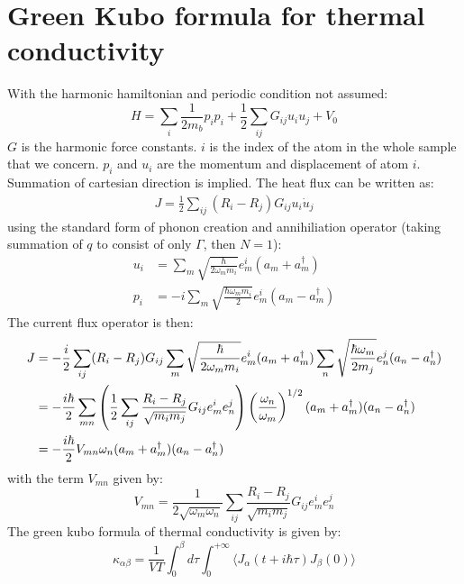 \documentclass{article}
\begin{document}
\section{Green Kubo formula for thermal conductivity}
With the harmonic hamiltonian and periodic condition not assumed:
\begin{equation}
    H = \sum_{i} \frac{1}{2m_b} p_{i} p_{i} + \frac{1}{2} \sum_{ij} G_{ij} u_{i} u_{j} + V_0
\end{equation}
$G$ is the harmonic force constants. $i$ is the index of the atom in the whole sample that we concern. $p_i$ and $u_i$ are the 
momentum and displacement of atom $i$. Summation of cartesian direction is implied. 
The heat flux can be written as:
\begin{eqnarray}
    J = \frac{1}{2}\sum_{ij} (R_i - R_j) G_{ij} u_i \dot{u}_j
\end{eqnarray}
using the standard form of phonon creation and annihiliation operator (taking summation of $q$ to consist of 
only $\Gamma$, then $N = 1$):
\begin{align}
    u_i &= \sum_{m} \sqrt{ \frac{\hbar}{2\omega_m m_i} } e_{m}^i (a_m + a^{\dagger}_m) \\
    p_i &= -i \sum_{m} \sqrt{ \frac{\hbar \omega_m m_i}{2} } e_{m}^i (a_m - a^{\dagger}_m)
\end{align}
The current flux operator is then:
\begin{align}
    J & = -\frac{i}{2} \sum_{ij} (R_i - R_j) G_{ij} \sum_{m} \sqrt{ \frac{\hbar}{2\omega_m m_i} } e_{m}^i (a_m + a^{\dagger}_m)
    \sum_{n} \sqrt{ \frac{\hbar \omega_m}{2m_j} } e_{n}^j (a_n - a^{\dagger}_n) \notag \\
      & = -\frac{i\hbar}{2} \sum_{mn} \left( \frac{1}{2}\sum_{ij} \frac{R_i - R_j}{\sqrt{m_im_j}} G_{ij} e_m^i e_n^j \right) 
      \left(\frac{\omega_n}{\omega_m}\right)^{1/2} (a_m + a^{\dagger}_m)(a_n - a^{\dagger}_n) \notag \\
      & = -\frac{i\hbar}{2} V_{mn} \omega_n (a_m + a^{\dagger}_m)(a_n - a^{\dagger}_n)
\end{align}
with the term $V_{mn}$ given by:
\begin{equation}
    V_{mn} = \frac{1}{2\sqrt{\omega_m \omega_n}} \sum_{ij}\frac{R_i - R_j}{\sqrt{m_im_j}} G_{ij} e_m^i e_n^j
\end{equation}
The green kubo formula of thermal conductivity is given by:
\begin{equation}
    \kappa_{\alpha\beta} = 
    \frac{1}{VT} \int_0^{\beta} d\tau \int_0^{+\infty} \langle J_{\alpha}(t + i\hbar\tau) J_{\beta} (0) \rangle
\end{equation}
\end{document}

